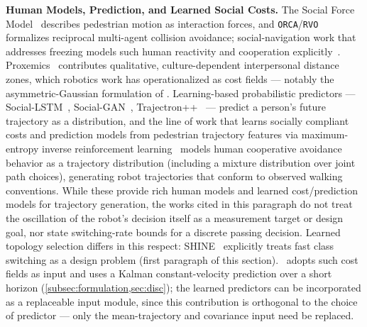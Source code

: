 \noindent\textbf{Human Models, Prediction, and Learned Social Costs.} The Social Force Model~\citep{helbing1995social} describes pedestrian motion as interaction forces, and \texttt{ORCA}/\texttt{RVO}~\citep{vandenberg2011rvo} formalizes reciprocal multi-agent collision avoidance; social-navigation work that addresses freezing models such human reactivity and cooperation explicitly~\citep{trautman2010,trautman2015dense}. Proxemics~\citep{hall1966hidden} contributes qualitative, culture-dependent interpersonal distance zones, which robotics work has operationalized as cost fields --- notably the asymmetric-Gaussian formulation of \citet{kirby2010thesis}. Learning-based probabilistic predictors --- Social-LSTM~\citep{alahi2016sociallstm}, Social-GAN~\citep{gupta2018socialgan}, Trajectron++~\citep{salzmann2020trajectron} --- predict a person's future trajectory as a distribution, and the line of work that learns socially compliant costs and prediction models from pedestrian trajectory features via maximum-entropy inverse reinforcement learning~\citep{kuderer2012feature,kretzschmar2016irl} models human cooperative avoidance behavior as a trajectory distribution (including a mixture distribution over joint path choices), generating robot trajectories that conform to observed walking conventions. While these provide rich human models and learned cost/prediction models for trajectory generation, the works cited in this paragraph do not treat the oscillation of the robot's decision itself as a measurement target or design goal, nor state switching-rate bounds for a discrete passing decision. Learned topology selection differs in this respect: SHINE~\citep{martinezbaselga2026shine} explicitly treats fast class switching as a design problem (first paragraph of this section). \sname\ adopts such cost fields as input and uses a Kalman constant-velocity prediction over a short horizon (\cref{subsec:formulation,sec:disc}); the learned predictors can be incorporated as a replaceable input module, since this contribution is orthogonal to the choice of predictor --- only the mean-trajectory and covariance input need be replaced.

